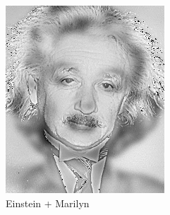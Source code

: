 \documentclass{article}
\begin{document}
\begin{minipage}{\linewidth}
\begin{minipage}{0.45\linewidth}
\begin{figure}[H]
			\includegraphics[width=\linewidth]{Ejercicio3/hybrid2.png}          
			\caption{Einstein + Marilyn}
		\end{figure}
    \end{minipage}
    

\end{minipage}
\end{document}
